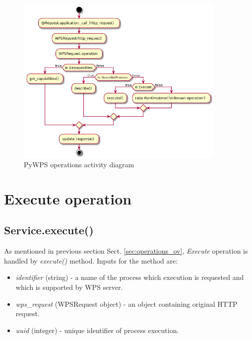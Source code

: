 \documentclass[12pt,a4paper]{article}
\begin{document}
\begin{figure}[h!]
\centering
\includegraphics[width=0.9\textwidth]{img/Diag_operations.png}
\caption{PyWPS operations activity diagram}
\label{fig:Diag_operations}
\end{figure}

\section{Execute operation}
\subsection{Service.execute()}
As mentioned in previous section Sect. \ref{sec:operations_ov}, \textit{Execute} operation is handled by \textit{execute()} method.
Inputs for the method are:
\begin{itemize}
\item \textit{identifier} (string) - a name of the process which execution is requested and which is supported by WPS server.
\item \textit{wps\_request} (WPSRequest object) - an object containing original HTTP request.
\item \textit{uuid} (integer) - unique identifier of process execution.
\end{itemize}
\end{document}
